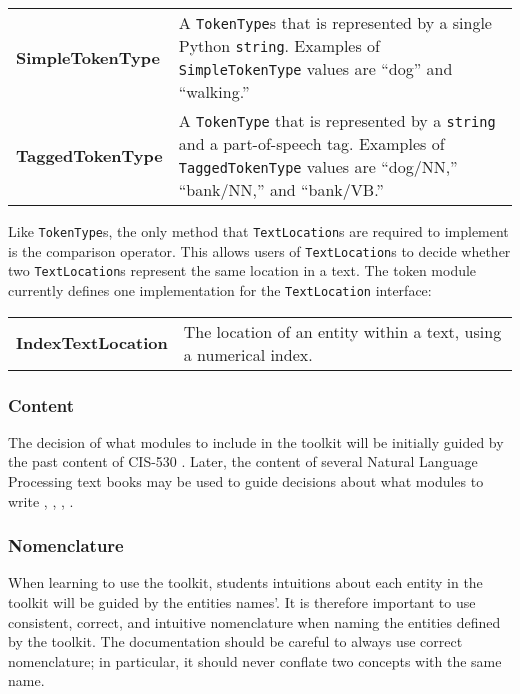 \documentclass{article}
\begin{document}
\vspace{1.2mm}\noindent
\begin{tabular}{||p{}p{}}
  \textbf{SimpleTokenType} & A \texttt{TokenType}s that is
  represented by a single Python \texttt{string}.  Examples of
  \texttt{SimpleTokenType} values are ``dog'' and ``walking.'' \\

  \textbf{TaggedTokenType} & A \texttt{TokenType} that is
  represented by a \texttt{string} and a part-of-speech tag.  Examples 
  of \texttt{TaggedTokenType} values are ``dog/NN,'' ``bank/NN,'' and
  ``bank/VB.'' \\
\end{tabular}
\vspace{1mm}

Like \texttt{TokenType}s, the only method that \texttt{TextLocation}s
are required to implement is the comparison operator.  This allows
users of \texttt{TextLocation}s to decide whether two
\texttt{TextLocation}s represent the same location in a text.  The
token module currently defines one implementation for the
\texttt{TextLocation} interface:

\vspace{1.2mm}\noindent
\begin{tabular}{||p{}p{}}
  \textbf{IndexTextLocation} & The location of an
  entity within a text, using a numerical index. \\
\end{tabular}
\vspace{1mm}

\subsubsection{Content}

The decision of what modules to include in the toolkit will be
initially guided by the past content of CIS-530 \cite{cis530}.  Later,
the content of several Natural Language Processing text books may be
used to guide decisions about what modules to write \cite{allen1995},
\cite{gazdar1989}, \cite{jurafsky2000}, \cite{manning2000}.

\subsubsection{Nomenclature}

When learning to use the toolkit, students intuitions about each
entity in the toolkit will be guided by the entities names'.  It is
therefore important to use consistent, correct, and intuitive
nomenclature when naming the entities defined by the toolkit.
The documentation should be careful to always use correct
nomenclature; in particular, it should never conflate two concepts
with the same name.
\end{document}
